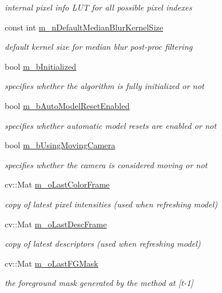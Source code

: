 \begin{DoxyCompactItemize}
\begin{DoxyCompactList}\small\item\em internal pixel info L\+UT for all possible pixel indexes \end{DoxyCompactList}\item 
const int \mbox{\hyperlink{class_background_subtractor_l_b_s_p_a2585fe6e41e10af6da3e325dc20fe7f1}{m\+\_\+n\+Default\+Median\+Blur\+Kernel\+Size}}
\begin{DoxyCompactList}\small\item\em default kernel size for median blur post-\/proc filtering \end{DoxyCompactList}\item 
bool \mbox{\hyperlink{class_background_subtractor_l_b_s_p_a55cea104a0924fd50d5bed0912828a7e}{m\+\_\+b\+Initialized}}
\begin{DoxyCompactList}\small\item\em specifies whether the algorithm is fully initialized or not \end{DoxyCompactList}\item 
bool \mbox{\hyperlink{class_background_subtractor_l_b_s_p_a9d260f4e42e3fc79fb21af950ca9087a}{m\+\_\+b\+Auto\+Model\+Reset\+Enabled}}
\begin{DoxyCompactList}\small\item\em specifies whether automatic model resets are enabled or not \end{DoxyCompactList}\item 
bool \mbox{\hyperlink{class_background_subtractor_l_b_s_p_a5b1ec2694ae59661bb146ad0d4d49811}{m\+\_\+b\+Using\+Moving\+Camera}}
\begin{DoxyCompactList}\small\item\em specifies whether the camera is considered moving or not \end{DoxyCompactList}\item 
cv\+::\+Mat \mbox{\hyperlink{class_background_subtractor_l_b_s_p_ab1dc003792ab1d0b881a6fd10e0e29b3}{m\+\_\+o\+Last\+Color\+Frame}}
\begin{DoxyCompactList}\small\item\em copy of latest pixel intensities (used when refreshing model) \end{DoxyCompactList}\item 
cv\+::\+Mat \mbox{\hyperlink{class_background_subtractor_l_b_s_p_a9c637c0b87cac495887295690d83ba13}{m\+\_\+o\+Last\+Desc\+Frame}}
\begin{DoxyCompactList}\small\item\em copy of latest descriptors (used when refreshing model) \end{DoxyCompactList}\item 
cv\+::\+Mat \mbox{\hyperlink{class_background_subtractor_l_b_s_p_adb6dc0af596c5592c91f9d8faa5c8a4b}{m\+\_\+o\+Last\+F\+G\+Mask}}
\begin{DoxyCompactList}\small\item\em the foreground mask generated by the method at \mbox{[}t-\/1\mbox{]} \end{DoxyCompactList}\end{DoxyCompactItemize}


